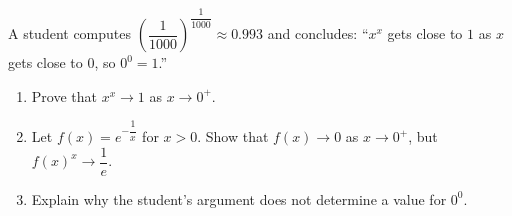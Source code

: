 A student computes $\left(\dfrac{1}{1000}\right)^{\dfrac{1}{1000}}\approx0.993$ and concludes: ``$x^x$ gets close to $1$ as $x$ gets close to $0$, so $0^0=1$.''
\begin{enumerate}
\item[(a)] Prove that $x^x\to1$ as $x\to0^+$.
\item[(b)] Let $f(x)=e^{-\dfrac1x}$ for $x>0$. Show that $f(x)\to0$ as $x\to0^+$, but $f(x)^x\to\dfrac1e$.
\item[(c)] Explain why the student's argument does not determine a value for $0^0$.
\end{enumerate}
